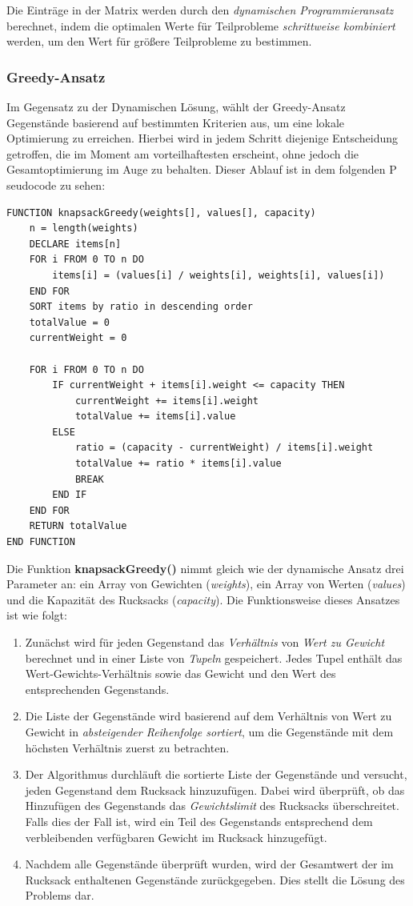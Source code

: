 Die Einträge in der Matrix werden durch den \textit{dynamischen Programmieransatz} berechnet, indem die optimalen Werte für
Teilprobleme \textit{schrittweise kombiniert} werden, um den Wert für größere Teilprobleme zu bestimmen.

\subsubsection*{Greedy-Ansatz}
Im Gegensatz zu der Dynamischen Lösung, wählt der Greedy-Ansatz Gegenstände basierend auf bestimmten Kriterien aus, um eine
lokale Optimierung zu erreichen. Hierbei wird in jedem Schritt diejenige Entscheidung getroffen, die im Moment am
vorteilhaftesten erscheint, ohne jedoch die Gesamtoptimierung im Auge zu behalten. Dieser Ablauf ist in dem folgenden P
seudocode zu sehen:
\begin{lstlisting}[style=csharp, caption={Greedy Algorithmus}]
FUNCTION knapsackGreedy(weights[], values[], capacity)
    n = length(weights)
    DECLARE items[n]
    FOR i FROM 0 TO n DO
        items[i] = (values[i] / weights[i], weights[i], values[i])
    END FOR
    SORT items by ratio in descending order
    totalValue = 0
    currentWeight = 0

    FOR i FROM 0 TO n DO
        IF currentWeight + items[i].weight <= capacity THEN
            currentWeight += items[i].weight
            totalValue += items[i].value
        ELSE
            ratio = (capacity - currentWeight) / items[i].weight
            totalValue += ratio * items[i].value
            BREAK
        END IF
    END FOR
    RETURN totalValue
END FUNCTION
\end{lstlisting}
    Die Funktion \textbf{knapsackGreedy()} nimmt gleich wie der dynamische Ansatz drei Parameter an: ein Array von Gewichten
    (\textit{weights}), ein Array von Werten (\textit{values}) und die Kapazität des Rucksacks (\textit{capacity}). Die
    Funktionsweise dieses Ansatzes ist wie folgt:
    \begin{enumerate}
    \item Zunächst wird für jeden Gegenstand das \textit{Verhältnis} von \textit{Wert zu Gewicht} berechnet und in einer Liste
    von \textit{Tupeln} gespeichert. Jedes Tupel enthält das Wert-Gewichts-Verhältnis sowie das Gewicht und den Wert des
    entsprechenden Gegenstands.
    \item Die Liste der Gegenstände wird basierend auf dem Verhältnis von Wert zu Gewicht in \textit{absteigender Reihenfolge
    sortiert}, um die Gegenstände mit dem höchsten Verhältnis zuerst zu betrachten.
    \item Der Algorithmus durchläuft die sortierte Liste der Gegenstände und versucht, jeden Gegenstand dem Rucksack hinzuzufügen.
    Dabei wird überprüft, ob das Hinzufügen des Gegenstands das \textit{Gewichtslimit} des Rucksacks überschreitet. Falls dies
    der Fall ist, wird ein Teil des Gegenstands entsprechend dem verbleibenden verfügbaren Gewicht im Rucksack hinzugefügt.
    \item Nachdem alle Gegenstände überprüft wurden, wird der Gesamtwert der im Rucksack enthaltenen Gegenstände zurückgegeben.
    Dies stellt die Lösung des Problems dar.
\end{enumerate}

